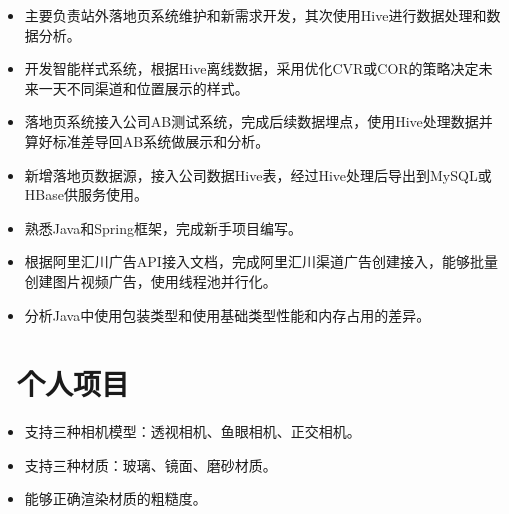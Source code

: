 \documentclass{resume}
\begin{document}

\begin{itemize}
  \item 主要负责站外落地页系统维护和新需求开发，其次使用Hive进行数据处理和数据分析。
  \item 开发智能样式系统，根据Hive离线数据，采用优化CVR或COR的策略决定未来一天不同渠道和位置展示的样式。
  \item 落地页系统接入公司AB测试系统，完成后续数据埋点，使用Hive处理数据并算好标准差导回AB系统做展示和分析。
  \item 新增落地页数据源，接入公司数据Hive表，经过Hive处理后导出到MySQL或HBase供服务使用。
\end{itemize}

\begin{itemize}
  \item 熟悉Java和Spring框架，完成新手项目编写。
  \item 根据阿里汇川广告API接入文档，完成阿里汇川渠道广告创建接入，能够批量创建图片视频广告，使用线程池并行化。
  \item 分析Java中使用包装类型和使用基础类型性能和内存占用的差异。
\end{itemize}


\section{\texorpdfstring{\faGithubAlt\ 个人项目}{个人项目}}
\begin{itemize}
  \item 支持三种相机模型：透视相机、鱼眼相机、正交相机。
  \item 支持三种材质：玻璃、镜面、磨砂材质。
  \item 能够正确渲染材质的粗糙度。
\end{itemize}
\end{document}
